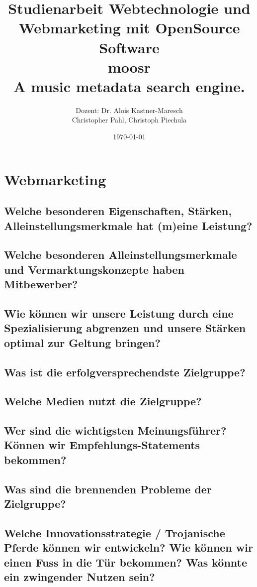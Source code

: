 \documentclass[11pt]{scrreprt}
\title{Studienarbeit Webtechnologie und Webmarketing mit OpenSource Software \\
    \textcolor{WildStrawberry}{\huge{moosr}} \\
    \normalsize{A music metadata search engine.}
}
\author{Dozent: Dr. Alois Kastner-Maresch\\
Christopher Pahl, Christoph Piechula}
\date{\today}
\begin{document}
\maketitle
\tableofcontents

\chapter{Webmarketing}

\section{Welche besonderen Eigenschaften, Stärken,
Alleinstellungsmerkmale hat (m)eine Leistung?}

\section{Welche besonderen Alleinstellungsmerkmale und
Vermarktungskonzepte haben Mitbewerber?}

\section{Wie können wir unsere Leistung durch eine
Spezialisierung abgrenzen und unsere Stärken
optimal zur Geltung bringen?}

\section{Was ist die erfolgversprechendste Zielgruppe?}

\section{Welche Medien nutzt die Zielgruppe?}

\section{Wer sind die wichtigsten Meinungsführer?
Können wir Empfehlungs-Statements bekommen?}

\section{Was sind die brennenden Probleme der
Zielgruppe?}

\section{Welche Innovationsstrategie / Trojanische
Pferde können wir entwickeln?
Wie können wir einen Fuss in die Tür
bekommen?
Was könnte ein zwingender Nutzen sein?}
\end{document}

